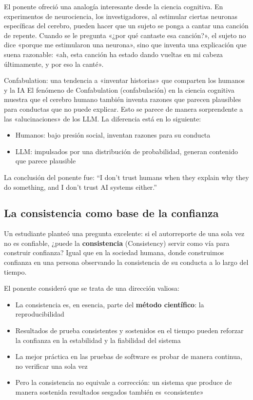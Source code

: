 \documentclass[a4paper]{article}
\begin{document}
El ponente ofreció una analogía interesante desde la ciencia cognitiva. En experimentos de neurociencia, los investigadores, al estimular ciertas neuronas específicas del cerebro, pueden hacer que un sujeto se ponga a cantar una canción de repente. Cuando se le pregunta «¿por qué cantaste esa canción?», el sujeto no dice «porque me estimularon una neurona», sino que inventa una explicación que suena razonable: «ah, esta canción ha estado dando vueltas en mi cabeza últimamente, y por eso la canté».

\begin{importantbox}{Confabulation: una tendencia a «inventar historias» que comparten los humanos y la IA}
El fenómeno de Confabulation (confabulación) en la ciencia cognitiva muestra que el cerebro humano también inventa razones que parecen plausibles para conductas que no puede explicar. Esto se parece de manera sorprendente a las «alucinaciones» de los LLM. La diferencia está en lo siguiente:
\begin{itemize}
    \item Humanos: bajo presión social, inventan razones para su conducta
    \item LLM: impulsados por una distribución de probabilidad, generan contenido que parece plausible
\end{itemize}
La conclusión del ponente fue: ``I don't trust humans when they explain why they do something, and I don't trust AI systems either.''
\end{importantbox}

\subsection{La consistencia como base de la confianza}

Un estudiante planteó una pregunta excelente: si el autorreporte de una sola vez no es confiable, ¿puede la \textbf{consistencia} (Consistency) servir como vía para construir confianza? Igual que en la sociedad humana, donde construimos confianza en una persona observando la consistencia de su conducta a lo largo del tiempo.

El ponente consideró que se trata de una dirección valiosa:

\begin{itemize}
    \item La consistencia es, en esencia, parte del \textbf{método científico}: la reproducibilidad
    \item Resultados de prueba consistentes y sostenidos en el tiempo pueden reforzar la confianza en la estabilidad y la fiabilidad del sistema
    \item La mejor práctica en las pruebas de software es probar de manera continua, no verificar una sola vez
    \item Pero la consistencia no equivale a corrección: un sistema que produce de manera sostenida resultados sesgados también es «consistente»
\end{itemize}
\end{document}
